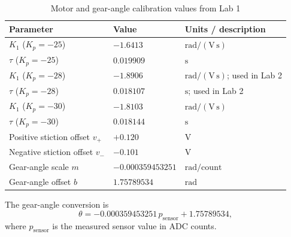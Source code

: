 \documentclass[11pt, letterpaper]{article}
\begin{document}
\begin{table}[H]
    \centering
    \small
    \caption{Motor and gear-angle calibration values from Lab 1}
    \label{tab:lab1-parameters}
    \begin{tabular}{lll}
        \toprule
        \textbf{Parameter}             & \textbf{Value}    & \textbf{Units / description}         \\
        \midrule
        $K_1$ ($K_p=-25$)              & $-1.6413$         & $\mathrm{rad/(V\,s)}$                \\
        $\tau$ ($K_p=-25$)             & $0.019909$        & $\mathrm{s}$                         \\
        $K_1$ ($K_p=-28$)              & $-1.8906$         & $\mathrm{rad/(V\,s)}$; used in Lab 2 \\
        $\tau$ ($K_p=-28$)             & $0.018107$        & $\mathrm{s}$; used in Lab 2          \\
        $K_1$ ($K_p=-30$)              & $-1.8103$         & $\mathrm{rad/(V\,s)}$                \\
        $\tau$ ($K_p=-30$)             & $0.018144$        & $\mathrm{s}$                         \\
        Positive stiction offset $v_+$ & $+0.120$          & $\mathrm{V}$                         \\
        Negative stiction offset $v_-$ & $-0.101$          & $\mathrm{V}$                         \\
        Gear-angle scale $m$           & $-0.000359453251$ & $\mathrm{rad/count}$                 \\
        Gear-angle offset $b$          & $1.75789534$      & $\mathrm{rad}$                       \\
        \bottomrule
    \end{tabular}
\end{table}

The gear-angle conversion is
\[
    \theta = -0.000359453251\,p_{\mathrm{sensor}} + 1.75789534,
\]
where $p_{\mathrm{sensor}}$ is the measured sensor value in ADC counts.

\clearpage
\end{document}
